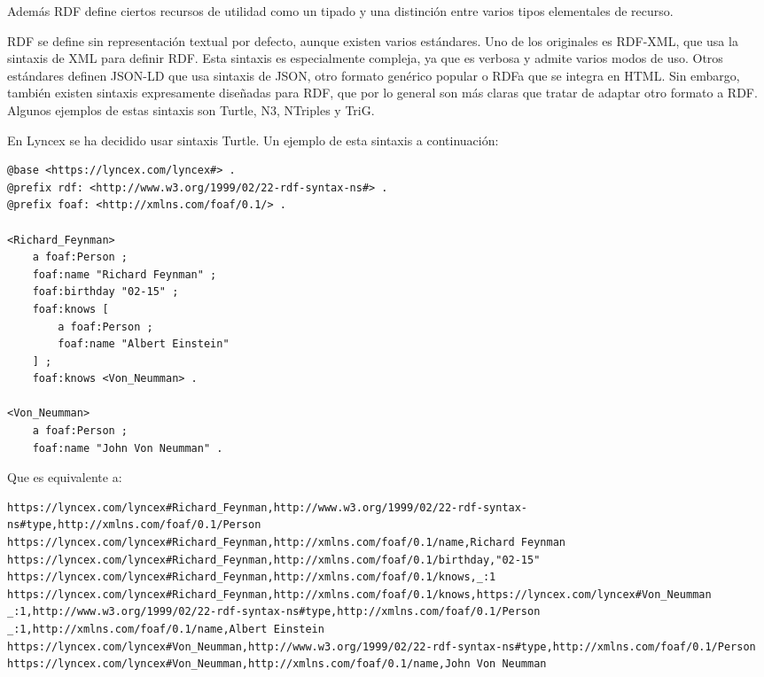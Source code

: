 \documentclass[12pt]{report} %
\begin{document}
Además RDF define ciertos recursos de utilidad como un tipado y una distinción entre varios tipos elementales de recurso.

RDF se define sin representación textual por defecto, aunque existen varios estándares. Uno de los originales es RDF-XML, que usa la sintaxis de XML para definir RDF. Esta sintaxis es especialmente compleja, ya que es verbosa y admite varios modos de uso.
Otros estándares definen JSON-LD que usa sintaxis de JSON, otro formato genérico popular o RDFa que se integra en HTML. Sin embargo, también existen sintaxis expresamente diseñadas para RDF, que por lo general son más claras que tratar de adaptar otro formato a RDF.
Algunos ejemplos de estas sintaxis son Turtle, N3, NTriples y TriG.

En Lyncex se ha decidido usar sintaxis Turtle. Un ejemplo de esta sintaxis a continuación:

\begin{lstlisting}
@base <https://lyncex.com/lyncex#> .
@prefix rdf: <http://www.w3.org/1999/02/22-rdf-syntax-ns#> .
@prefix foaf: <http://xmlns.com/foaf/0.1/> .

<Richard_Feynman>
    a foaf:Person ;
    foaf:name "Richard Feynman" ;
    foaf:birthday "02-15" ;
    foaf:knows [
        a foaf:Person ;
        foaf:name "Albert Einstein"
    ] ;
    foaf:knows <Von_Neumman> .

<Von_Neumman>
    a foaf:Person ;
    foaf:name "John Von Neumman" .
\end{lstlisting}

Que es equivalente a:

\begin{adjustbox}{width=\textwidth,keepaspectratio}
\begin{lstlisting}
https://lyncex.com/lyncex#Richard_Feynman,http://www.w3.org/1999/02/22-rdf-syntax-ns#type,http://xmlns.com/foaf/0.1/Person
https://lyncex.com/lyncex#Richard_Feynman,http://xmlns.com/foaf/0.1/name,Richard Feynman
https://lyncex.com/lyncex#Richard_Feynman,http://xmlns.com/foaf/0.1/birthday,"02-15"
https://lyncex.com/lyncex#Richard_Feynman,http://xmlns.com/foaf/0.1/knows,_:1
https://lyncex.com/lyncex#Richard_Feynman,http://xmlns.com/foaf/0.1/knows,https://lyncex.com/lyncex#Von_Neumman
_:1,http://www.w3.org/1999/02/22-rdf-syntax-ns#type,http://xmlns.com/foaf/0.1/Person
_:1,http://xmlns.com/foaf/0.1/name,Albert Einstein
https://lyncex.com/lyncex#Von_Neumman,http://www.w3.org/1999/02/22-rdf-syntax-ns#type,http://xmlns.com/foaf/0.1/Person
https://lyncex.com/lyncex#Von_Neumman,http://xmlns.com/foaf/0.1/name,John Von Neumman
\end{lstlisting}
\end{adjustbox}
\end{document}
